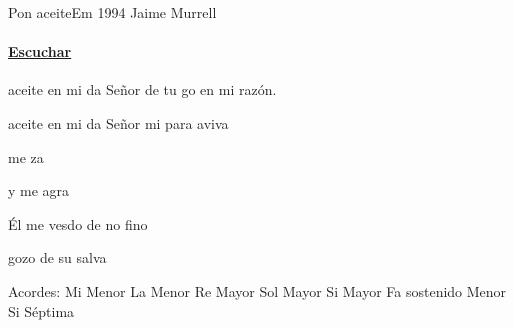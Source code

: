 \documentclass[12pt, spanish]{book}
\begin{document}
    \begin{song}{Pon aceite}{Em}
    {1994} %
    {Jaime Murrell}
    {} %
    {}
        \ifChordBk
        \paragraph{\mbox{}\hfill\protect\href{https://open.spotify.com/intl-es/track/3qACviami2SMB7SuuMUtiE}{Escuchar}\mbox{}\hfill}
        \fi


        \begin{SBOpGroup}
             aceite en mi da Señor de tu go en mi razón.

             aceite en mi da Señor mi para aviva ~
        \end{SBOpGroup}

        \begin{SBChorus}
             me za

            y me agra

            Él me  vesdo de no fino

             gozo de su salva
        \end{SBChorus}

        \ifChordBk
        \begin{SBOpGroup}
            Acordes:\break
            \upchord{\Em}\qquad Mi Menor \hfill
            \upchord{\Am}\qquad La Menor \hfill\null\break
            \upchord{\D}\qquad Re Mayor \hfill
            \upchord{\G}\qquad Sol Mayor \hfill\null\break
            \upchord{\B}\qquad Si Mayor \hfill
            \upchord{\Fsm}\qquad Fa sostenido Menor \hfill\null\break
            \upchord{\Bseven}\qquad Si S\'eptima \hfill
        \end{SBOpGroup}
        \fi
    \end{song}
\end{document}
